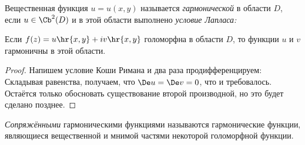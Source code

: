 \documentclass[a4paper]{article}
\begin{document}
\begin{df}
Вещественная функция $u=u(x,y)$ называется \emph{гармонической} в области $D$, если $u \in \Cb^2(D)$ и в этой области
выполнено \emph{условие Лапласа:}
\end{df}

\begin{stm}
Если $f(z) = u\hr{x,y} + iv\hr{x,y}$ голоморфна в области $D$, то функции $u$ и $v$ гармоничны в этой области.
\end{stm}
\begin{proof}
Напишем условие Коши Римана и два раза продифференцируем:
Складывая равенства, получаем, что $\De u = \De v = 0$, что и требовалось. Остаётся только обосновать существование
второй производной, но это будет сделано позднее.
\end{proof}

\begin{df}
\emph{Сопряжёнными} гармоническими функциями называются гармонические функции,
являющиеся вещественной и мнимой частями некоторой голоморфной функции.
\end{df}
\end{document}
